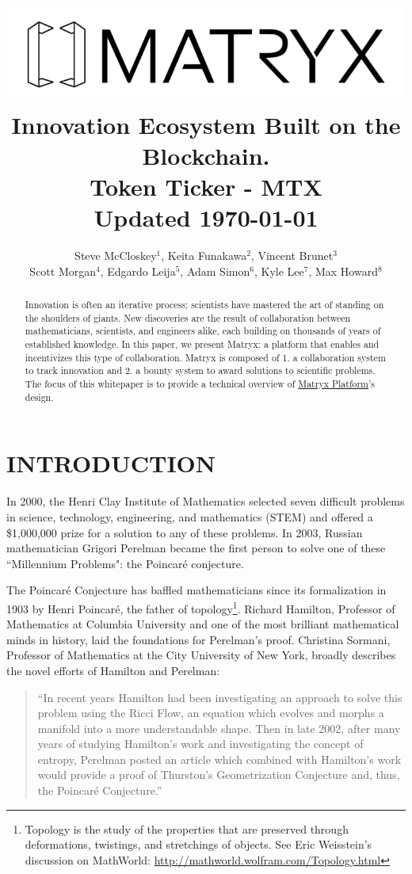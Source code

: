 \documentclass[a4paper, 10pt, conference]{ieeeconf}      %
\title{ \includegraphics[scale=.5]{logo.png}  \\
\large Innovation Ecosystem Built on the Blockchain. \\ Token Ticker - MTX \\ Updated \today
}
\author{Steve McCloskey$^{1}$, Keita Funakawa$^{2}$, Vincent Brunet$^{3}$ \\
Scott Morgan$^{4}$, Edgardo Leija$^{5}$, Adam Simon$^{6}$, Kyle Lee$^{7}$, Max Howard$^{8}$ }
\begin{document}
\maketitle
\thispagestyle{empty}
\pagestyle{empty}


\begin{abstract}

Innovation is often an iterative process; scientists have mastered the art of standing on the shoulders of giants. 
New discoveries are the result of collaboration between mathematicians, scientists, and engineers alike, each building on thousands of years of established knowledge.
In this paper, we present Matryx: a platform that enables and incentivizes this type of collaboration.
Matryx is composed of 1. a collaboration system to track innovation and 2. a bounty system to award solutions to scientific problems.
The focus of this whitepaper is to provide a technical overview of \href{https://github.com/matryx/MatryxPlatform}{Matryx Platform}'s design.  

\end{abstract}


\section{INTRODUCTION}\label{intro}
In 2000, the Henri Clay Institute of Mathematics selected seven difficult problems in science, technology, engineering, and mathematics (STEM) and offered a \$1,000,000 prize for a solution to any of these problems. 
In 2003, Russian mathematician Grigori Perelman became the first person to solve one of these ``Millennium Problems": the Poincaré conjecture.

The Poincaré Conjecture has baffled mathematicians since its formalization in 1903 by Henri Poincaré, the father of topology\footnote{Topology is the study of the properties that are preserved through deformations, twistings, and stretchings of objects. See Eric Weisstein's discussion on MathWorld: \href{http://mathworld.wolfram.com/Topology.html}{http://mathworld.wolfram.com/Topology.html}}.
Richard Hamilton, Professor of Mathematics at Columbia University and one of the most brilliant mathematical minds in history, laid the foundations for Perelman's proof. 
Christina Sormani, Professor of Mathematics at the City University of New York, broadly describes the novel efforts \cite{sormani} of Hamilton and Perelman:
\begin{quote}
“In recent years Hamilton had been investigating an approach to solve this problem using the Ricci Flow, an equation which evolves and morphs a manifold into a more understandable shape. Then in late 2002, after many years of studying Hamilton’s work and investigating the concept of entropy, Perelman posted an article which combined with Hamilton’s work would provide a proof of Thurston’s Geometrization Conjecture and, thus, the Poincaré Conjecture.” 
\end{quote}
\end{document}
